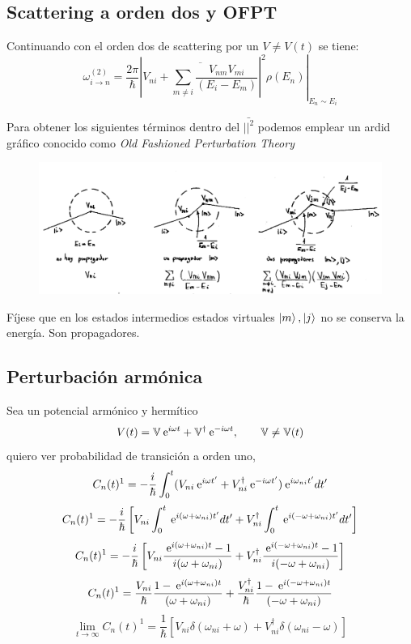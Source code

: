 \documentclass[10pt,oneside]{CBFT_book}
\begin{document}
\subsection{Scattering a orden dos y OFPT}

Continuando con el orden dos de scattering por un $V\neq V(t)$ se tiene:
\[
	\omega_{i\to n}^{(2)} = \frac{2\pi}{\hbar}\left. \left| \overline{ V_{ni} + \sum_{m\neq i} 
	\frac{V_{nm}V_{mi}}{(E_i-E_m)}} \right|^2 \rho(E_n) \right|_{E_n\sim E_i}
\]

Para obtener los siguientes términos dentro del $\bar{||^2}$ podemos emplear un ardid gráfico conocido como 
{\it Old Fashioned Perturbation Theory}

\begin{figure}[!thb]
	\begin{center}
	\includegraphics[width=1.0\textwidth]{images/teo2_24.pdf}
	\end{center}
	\caption{}
\end{figure} 


Fíjese que en los estados intermedios estados virtuales $\Ket{m},\Ket{j}$ no se conserva la energía. Son 
propagadores.


\subsection{Perturbación armónica}

Sea un potencial armónico y hermítico 
\[
	V(t) = \mathbb{V} \:\mathrm{e}^{i\omega t} + \mathbb{V}^\dagger \:\mathrm{e}^{-i\omega t},
		\qquad \mathbb{V}\neq \mathbb{V}(t)
\]
quiero ver probabilidad de transición a orden uno,
\[
	C_n(t)^1 = -\frac{i}{\hbar} \int_0^t ( V_{ni}\:\mathrm{e}^{i\omega t'}+ V_{ni}^\dagger \:\mathrm{e}^{-i\omega t'} )
		\:\mathrm{e}^{i\omega_{ni}t'}dt'
\]
\[
	C_n(t)^1 = -\frac{i}{\hbar} \left[ V_{ni} \int_0^t \:\mathrm{e}^{i(\omega +\omega_{ni})t'} dt' + 
		V_{ni}^\dagger \int_0^t \:\mathrm{e}^{i(-\omega +\omega_{ni})t'} dt' \right]
\]
\[
	C_n(t)^1 = -\frac{i}{\hbar} \left[ V_{ni} \frac{\:\mathrm{e}^{i(\omega +\omega_{ni})t} -1}{i( \omega +\omega_{ni} )}
		+ V_{ni}^\dagger \frac{\:\mathrm{e}^{i(-\omega +\omega_{ni})t} - 1}{i(-\omega +\omega_{ni})} \right]
\]
\[
	C_n(t)^1 = \frac{V_{ni}}{\hbar} \frac{1-\:\mathrm{e}^{i(\omega +\omega_{ni})t}}{( \omega +\omega_{ni} )}
		+ \frac{V_{ni}^\dagger}{\hbar} \frac{1-\:\mathrm{e}^{i(-\omega +\omega_{ni})t}}{(-\omega +\omega_{ni})}
\]
\[
	\lim_{t\to\infty} C_n(t)^1 = \frac{1}{\hbar}\left[ V_{ni}\delta(\omega_{ni}+\omega) 
		+ V_{ni}^\dagger \delta(\omega_{ni}-\omega) \right]
\]
\end{document}
